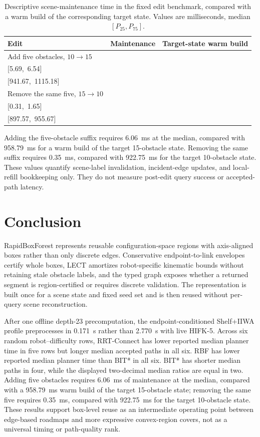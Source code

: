 \documentclass[journal]{IEEEtran}
\newcommand{\rbf}{RBF}
\newcommand{\iqr}[3]{\shortstack{#1\\{\scriptsize[#2,\ #3]}}}
\begin{document}
\begin{table}[!t]
\centering
\caption{Descriptive scene-maintenance time in the fixed edit benchmark,
compared with a warm build of the corresponding target state. Values are
milliseconds, median $[P_{25},P_{75}]$.}
\label{tab:tro-dynamic-update}
\scriptsize
\setlength{\tabcolsep}{3.0pt}
\renewcommand{\arraystretch}{1.05}
\begin{tabular}{@{}lcc@{}}
\toprule
Edit & Maintenance & Target-state warm build \\
\midrule
Add five obstacles, $10\rightarrow15$ & \iqr{6.06}{5.69}{6.54} & \iqr{958.79}{941.67}{1115.18} \\
Remove the same five, $15\rightarrow10$ & \iqr{0.35}{0.31}{1.65} & \iqr{922.75}{897.57}{955.67} \\
\bottomrule
\end{tabular}
\end{table}

Adding the five-obstacle suffix requires 6.06~ms at the median, compared with
958.79~ms for a warm build of the target 15-obstacle state. Removing the same
suffix requires 0.35~ms, compared with 922.75~ms for the target 10-obstacle
state. These values quantify scene-label invalidation, incident-edge updates,
and local-refill bookkeeping only. They do not measure post-edit query success
or accepted-path latency.

\FloatBarrier
\section{Conclusion}\label{sec:conclusion}

RapidBoxForest represents reusable configuration-space regions with
axis-aligned boxes rather than only discrete edges. Conservative endpoint-to-link
envelopes certify whole boxes, LECT amortizes robot-specific kinematic bounds
without retaining stale obstacle labels, and the typed graph exposes whether a
returned segment is region-certified or requires discrete validation. The
representation is built once for a scene state and fixed seed set and is
then reused without per-query scene reconstruction.

After one offline depth-23 precomputation, the endpoint-conditioned Shelf+IIWA
profile preprocesses in 0.171~s rather than 2.770~s with live HIFK-5. Across six
random robot--difficulty rows, RRT-Connect has lower reported median planner
time in five rows but longer median accepted paths in all six. \rbf{} has lower
reported median planner time than BIT* in all six. BIT* has shorter median paths
in four, while the displayed two-decimal median ratios are equal in two.
Adding five obstacles requires 6.06~ms of maintenance at the median, compared
with a 958.79~ms warm build of the target 15-obstacle state; removing the same five requires 0.35~ms, compared
with 922.75~ms for the target 10-obstacle state. These results support box-level
reuse as an intermediate operating point between edge-based roadmaps and more
expressive convex-region covers, not as a universal timing or path-quality rank.
\end{document}
